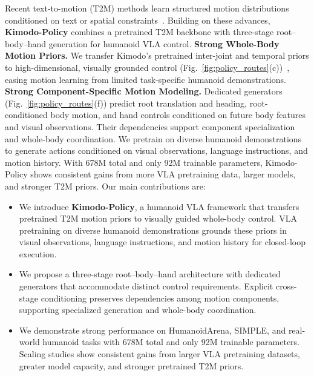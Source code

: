 Recent text-to-motion (T2M) methods learn structured motion distributions conditioned on text or spatial constraints~\cite{temos,mdm,mld,t2mgpt,momask,omnicontrol}.
Building on these advances, \textbf{Kimodo-Policy} combines a pretrained T2M backbone with three-stage root--body--hand generation for humanoid VLA control.
\textbf{ Strong Whole-Body Motion Priors.}
We transfer Kimodo's pretrained inter-joint and temporal priors to high-dimensional, visually grounded control (Fig.~\ref{fig:policy_routes}(c))~\cite{kimodo}, easing motion learning from limited task-specific humanoid demonstrations.
\textbf{ Strong Component-Specific Motion Modeling.}
Dedicated generators (Fig.~\ref{fig:policy_routes}(f)) predict root translation and heading, root-conditioned body motion, and hand controls conditioned on future body features and visual observations. Their dependencies support component specialization and whole-body coordination.
We pretrain on diverse humanoid demonstrations to generate actions conditioned on visual observations, language instructions, and motion history.
With 678M total and only 92M trainable parameters, Kimodo-Policy shows consistent gains from more VLA pretraining data, larger models, and stronger T2M priors. Our main contributions are:
\begin{itemize}
  \item We introduce \textbf{Kimodo-Policy}, a humanoid VLA framework that transfers pretrained T2M motion priors to visually guided whole-body control. VLA pretraining on diverse humanoid demonstrations grounds these priors in visual observations, language instructions, and motion history for closed-loop execution.

  \item We propose a three-stage root--body--hand architecture with dedicated generators that accommodate distinct control requirements. Explicit cross-stage conditioning preserves dependencies among motion components, supporting specialized generation and whole-body coordination.
  
  \item We demonstrate strong performance on HumanoidArena, SIMPLE, and real-world humanoid tasks with 678M total and only 92M trainable parameters. Scaling studies show consistent gains from larger VLA pretraining datasets, greater model capacity, and stronger pretrained T2M priors.
\end{itemize}

